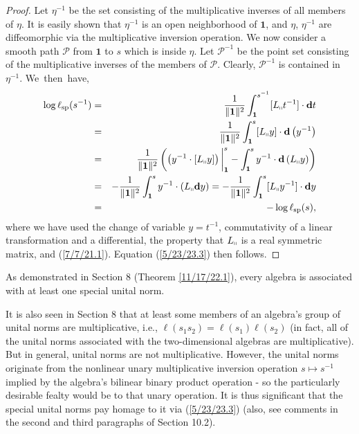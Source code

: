 \documentclass{amsart}
\numberwithin{equation}{section}
\theoremstyle{definition}
\numberwithin{theorem}{section}
\begin{document}
\begin{proof}
Let $\eta^{-1}$ be the set consisting of the multiplicative inverses of all members of $\eta$.  It is easily shown that $\eta^{-1}$ is an open neighborhood of $\mathbf{1}$, and $\eta$, $\eta^{-1}$ are diffeomorphic via the multiplicative inversion operation.  
We now consider a smooth path $\mathcal{P}$ from $\mathbf{1}$ to $s$ which is inside $\eta$.  Let $\mathcal{P}^{-1}$ be the point set consisting of the multiplicative inverses of the members of $\mathcal{P}$.  Clearly, $\mathcal{P}^{-1}$ is contained in $\eta^{-1}$. 
\mbox{We then have,} \begin{eqnarray}  \log \ell_{\rm sp}(s^{-1})   &=&   \frac{1}{\|{\bf 1}\|^2} \int_{\bf 1}^{s^{-1}} [L_{\shortparallel}t^{-1}] \cdot \mathbf{d}t \nonumber \\ &=&  \frac{1}{\|{\bf 1}\|^2} \int_{\bf 1}^s [L_{\shortparallel}y]\cdot \mathbf{d}\left(y^{-1}\right) \nonumber \\ &=&  \frac{1}{\|{\bf 1}\|^2}\left(\left(y^{-1}\cdot [L_{\shortparallel}y]\right)\bigg|_{\bf 1}^s - \int_{\bf 1}^s y^{-1}\cdot \mathbf{d}\left(L_{\shortparallel}y\right)\right)   \nonumber \\ &=& -\frac{1}{\|{\bf 1}\|^2} \int_{\bf 1}^s y^{-1}\cdot (L_{\shortparallel}\mathbf{d}y) = -\frac{1}{\|{\bf 1}\|^2} \int_{\bf 1}^s [L_{\shortparallel}y^{-1}] \cdot \mathbf{d}y  \nonumber \\ &=& -\log \ell_{\rm sp}(s),\label{4/2/23.5} \end{eqnarray} where we have used the change of variable $y=t^{-1}$, commutativity of a linear transformation and a differential, the property that $L_{\shortparallel}$ is a real symmetric matrix, and  (\ref{7/7/21.1}).  Equation (\ref{5/23/23.3}) then follows.
\end{proof}

As demonstrated in Section 8 (Theorem \ref{11/17/22.1}), every algebra is associated with at least one special unital norm.

It is also seen in Section 8 that at least some members of an algebra's group of unital norms are multiplicative, i.e., $\ell(s_1s_2) = \ell(s_1)\ell(s_2)$ (in fact, all of the unital norms associated with the two-dimensional algebras are multiplicative).   But in general, unital norms are not multiplicative.  However, the unital norms originate from the nonlinear unary multiplicative inversion operation $s\mapsto s^{-1}$ implied by the algebra's bilinear binary product operation - so the particularly desirable fealty would be to that unary operation.  It is thus significant that the special unital norms pay homage to it via (\ref{5/23/23.3}) (also, see comments in the second and third paragraphs of Section 10.2).
\end{document}
